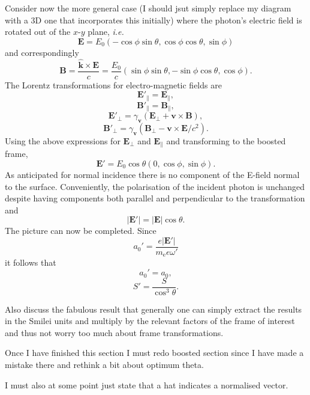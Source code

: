 Consider now the more general case (I should jsut simply replace my diagram with a 3D one that incorporates this initially) where the photon's electric field is rotated out of the $x$-$y$ plane, \textit{i.e.}
\begin{equation}
	\mathbf{E} = E_0(-\cos\phi\sin\theta,\cos\phi\cos\theta,\sin\phi)
\end{equation}
and correspondingly
\begin{equation}
	\mathbf{B} = \frac{\hat{\mathbf{k}} \times \mathbf{E}}{c}= \frac{E_0}{c}(\sin\phi\sin\theta,-\sin\phi\cos\theta,\cos\phi).
\end{equation}
The Lorentz transformations for electro-magnetic fields are
\begin{equation}
	\mathbf{E}'_\parallel = \mathbf{E}_\parallel,
\end{equation}
\begin{equation}
	\mathbf{B}'_\parallel = \mathbf{B}_\parallel,
\end{equation}
\begin{equation}
	\mathbf{E}'_\perp = \gamma_\mathbf{v}(\mathbf{E}_\perp + \mathbf{v} \times \mathbf{B}),
\end{equation}
\begin{equation}
	\mathbf{B}'_\perp = \gamma_\mathbf{v}(\mathbf{B}_\perp - \mathbf{v} \times \mathbf{E}/c^2).
\end{equation}
Using the above expressions for $\mathbf{E}_\perp$ and $\mathbf{E}_\parallel$ and transforming to the boosted frame,
\begin{equation}
	\mathbf{E}' = E_0\cos\theta (0,\cos\phi,\sin\phi).
\end{equation}
As anticipated for normal incidence there is no component of the E-field normal to the surface. Conveniently, the polarisation of the incident photon is unchanged despite having components both parallel and perpendicular to the transformation and 
\begin{equation}
	|\mathbf{E}'| = |\mathbf{E}|\cos\theta.
\end{equation}
The picture can now be completed. Since
\begin{equation}
	a_0' = \frac{e|\mathbf{E}'|}{m_\mathrm{e}e\omega'}
\end{equation}
it follows that
\begin{equation}
	a_0' = a_0,
\end{equation}
\begin{equation}
	S' = \frac{S}{\cos^3\theta}.
\end{equation}

Also discuss the fabulous result that generally one can simply extract the results in the Smilei units and multiply by the relevant factors of the frame of interest and thus not worry too much about frame transformations.




Once I have finished this section I must redo boosted section since I have made a mistake there and rethink a bit about optimum theta.

I must also at some point just state that a hat indicates a normalised vector.

